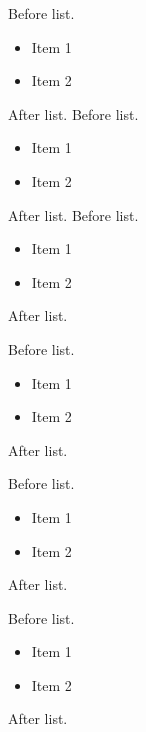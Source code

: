 Before list.
\begin{itemize}
\item Item 1
\item Item 2
\end{itemize}

After list.
Before list.
\begin{itemize}
\item Item 1
\item Item 2
\end{itemize}

After list.
Before list.
\begin{itemize}
\item Item 1
\item Item 2
\end{itemize}

After list.
\begin{frame}[t]
Before list.
\begin{itemize}
\item Item 1
\item Item 2
\end{itemize}

After list.
\end{frame}

\begin{frame}[t]
Before list.
\begin{itemize}
\item Item 1
\item Item 2
\end{itemize}

After list.
\end{frame}

\begin{frame}[t]
Before list.
\begin{itemize}
\item Item 1
\item Item 2
\end{itemize}

After list.
\end{frame}

